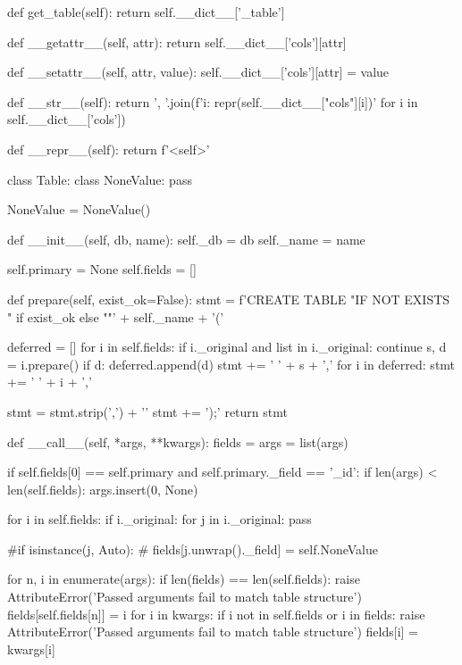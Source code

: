 \begin{pythoncode}
    def get_table(self):
        return self.__dict__['_table']

    def __getattr__(self, attr):
        return self.__dict__['cols'][attr]
    
    def __setattr__(self, attr, value):
        self.__dict__['cols'][attr] = value
    
    def __str__(self):
        return ', '.join(f'{i}: {repr(self.__dict__["cols"][i])}' for i in self.__dict__['cols'])
    
    def __repr__(self):
        return f'<{self}>'


class Table:
    class NoneValue:
        pass

    NoneValue = NoneValue()

    def __init__(self, db, name):
        self._db = db
        self._name = name

        self.primary = None
        self.fields = []

    def prepare(self, exist_ok=False):
        stmt = f'CREATE TABLE {"IF NOT EXISTS " if exist_ok else ""}' + self._name + '(\n'

        deferred = []
        for i in self.fields:
            if i._original and list in i._original:
                continue
            s, d = i.prepare()
            if d:
                deferred.append(d)
            stmt += '  ' + s + ',\n'
        for i in deferred:
            stmt += '  ' + i + ',\n'

        stmt = stmt.strip(',\n') + '\n'
        stmt += ');'
        return stmt

    def __call__(self, *args, **kwargs):
        fields = {}
        args = list(args)

        if self.fields[0] == self.primary and self.primary._field == '_id':
            if len(args) < len(self.fields):
                args.insert(0, None)
     
        for i in self.fields:
            if i._original:
                for j in i._original:
                    pass

                    #if isinstance(j, Auto):
                    #    fields[j.unwrap().\_field] = self.NoneValue

        for n, i in enumerate(args):
            if len(fields) == len(self.fields):
                raise AttributeError('Passed arguments fail to match table structure')
            fields[self.fields[n]] = i
        for i in kwargs:
            if i not in self.fields or i in fields:
                raise AttributeError('Passed arguments fail to match table structure')
            fields[i] = kwargs[i]
        

\end{pythoncode}
